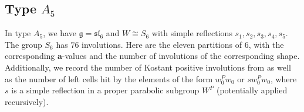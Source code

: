 \documentclass[a4paper]{amsart}
\def\HK#1{\textcolor[rgb]{.75,0.00,0.00}{[HK: #1]}}
\begin{document}

\subsection{Type $A_5$}\label{s5.5}

In type $A_5$, we have $\mathfrak{g}=\mathfrak{sl}_6$
and $W\cong S_6$ with simple reflections $s_1,s_2,s_3,s_4,s_5$.
The group $S_6$ has $76$ involutions. Here are the eleven 
partitions of $6$, with the corresponding  $\mathbf{a}$-values
and the number of involutions of the corresponding shape.
Additionally, we record the number of Kostant positive
involutions from \cite[Subsection~10.1]{KMM} 
as well as the number of
left cells hit by the elements of the form
$w_0^Pw_0$ or $sw_0^Pw_0$, where $s$ is a simple
reflection in a proper parabolic subgroup $W^P$
(potentially applied recursively).

\end{document}
